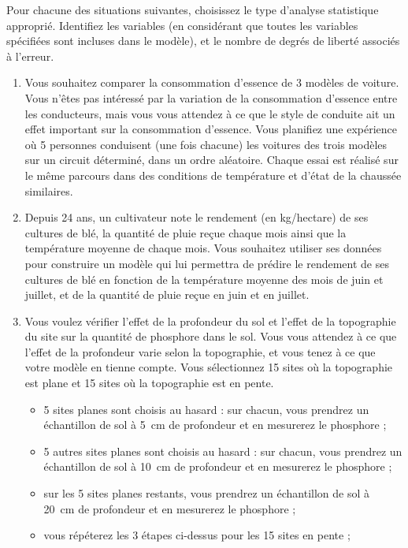\begin{exercice}
Pour chacune des situations suivantes, choisissez le type d'analyse statistique approprié.
Identifiez les variables (en considérant que toutes les variables spécifiées sont incluses
dans le modèle), et le nombre de degrés de liberté associés à l'erreur.
\begin{enumerate}[label=(\alph*)]
  \item Vous souhaitez comparer la consommation d'essence de 3 modèles de voiture. Vous
  n'êtes pas intéressé par la variation de la consommation d'essence entre les conducteurs,
  mais vous vous attendez à ce que le style de conduite ait un effet important sur la
  consommation d'essence. Vous planifiez une expérience où 5 personnes conduisent (une fois
  chacune) les voitures des trois modèles sur un circuit déterminé, dans un ordre aléatoire.
  Chaque essai est réalisé sur le même parcours dans des conditions de température et d'état
  de la chaussée similaires.
  \item Depuis 24 ans, un cultivateur note le rendement (en kg/hectare) de ses cultures de
  blé, la quantité de pluie reçue chaque mois ainsi que la température moyenne de chaque
  mois. Vous souhaitez utiliser ses données pour construire un modèle qui lui permettra de
  prédire le rendement de ses cultures de blé en fonction de la température moyenne des mois
  de juin et juillet, et de la quantité de pluie reçue en juin et en juillet.
  \item Vous voulez vérifier l'effet de la profondeur du sol et l'effet de la topographie du
  site sur la quantité de phosphore dans le sol. Vous vous attendez à ce que l'effet de la
  profondeur varie selon la topographie, et vous tenez à ce que votre modèle en tienne
  compte. Vous sélectionnez 15 sites où la topographie est plane et 15 sites où la
  topographie est en pente.
  \begin{itemize}
    \item 5 sites planes sont choisis au hasard : sur chacun, vous prendrez un échantillon
    de sol à 5~cm de profondeur et en mesurerez le phosphore ;
    \item 5 autres sites planes sont choisis au hasard : sur chacun, vous prendrez un
    échantillon de sol à 10~cm de profondeur et en mesurerez le phosphore ;
    \item sur les 5 sites planes restants, vous prendrez un échantillon de sol à 20~cm de
    profondeur et en mesurerez le phosphore ;
    \item vous répéterez les 3 étapes ci-dessus pour les 15 sites en pente ;

\end{itemize}
\end{enumerate}
\end{exercice}
